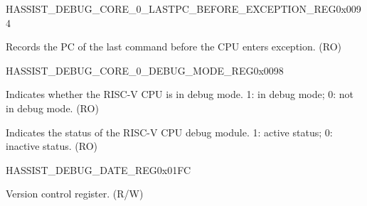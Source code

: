 \begin{register}{H}{ASSIST\_DEBUG\_CORE\_0\_LASTPC\_BEFORE\_EXCEPTION\_REG}{0x0094}\label{regdesc:ASSISTDEBUGCORE0LASTPCBEFOREEXCEPTIONREG}
%
\regnewline%
\begin{regdesc}\begin{reglist}
\label{fielddesc:ASSISTDEBUGCORE0LASTPCBEFOREEXC}\item [ASSIST\_DEBUG\_CORE\_0\_LASTPC\_BEFORE\_EXC] Records the PC of the last command before the CPU enters exception. (RO)
\end{reglist}\end{regdesc}
\end{register}


\begin{register}{H}{ASSIST\_DEBUG\_CORE\_0\_DEBUG\_MODE\_REG}{0x0098}\label{regdesc:ASSISTDEBUGCORE0DEBUGMODEREG}
%
%
%
\regnewline%
\begin{regdesc}\begin{reglist}
\label{fielddesc:ASSISTDEBUGCORE0DEBUGMODE}\item [ASSIST\_DEBUG\_CORE\_0\_DEBUG\_MODE] Indicates whether the RISC-V CPU is in debug mode. 1: in debug mode; 0: not in debug mode. (RO)
\label{fielddesc:ASSISTDEBUGCORE0DEBUGMODULEACTIVE}\item [ASSIST\_DEBUG\_CORE\_0\_DEBUG\_MODULE\_ACTIVE] Indicates the status of the RISC-V CPU debug module. 1: active status; 0: inactive status. (RO)
\end{reglist}\end{regdesc}
\end{register}


\begin{register}{H}{ASSIST\_DEBUG\_DATE\_REG}{0x01FC}\label{regdesc:ASSISTDEBUGDATEREG}
%
%
\regnewline%
\begin{regdesc}\begin{reglist}
\label{fielddesc:ASSISTDEBUGDATE}\item [ASSIST\_DEBUG\_\_DATE] Version control register. (R/W)
\end{reglist}\end{regdesc}
\end{register}
